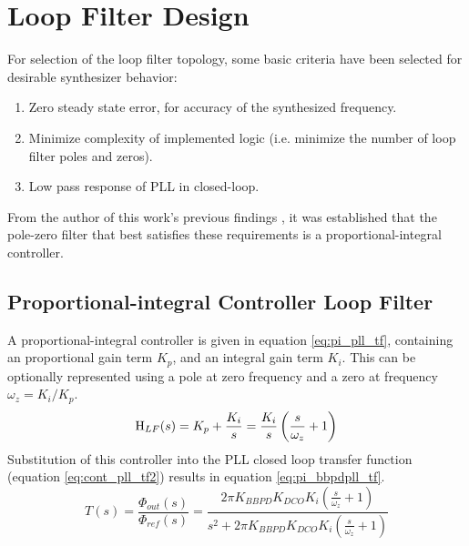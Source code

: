 \section{Loop Filter Design}\label{sec:design_lf}
	For selection of the loop filter topology, some basic criteria have been selected for desirable synthesizer behavior:
	\begin{enumerate}[itemsep=0pt,label=\protect\mycirc{\arabic*}]
		\setlength\itemsep{-0.8em}
		\item Zero steady state error, for accuracy of the synthesized frequency.
		\item Minimize complexity of implemented logic (i.e. minimize the number of loop filter poles and zeros).
		\item Low pass response of PLL in closed-loop.
	\end{enumerate}
	From the author of this work's previous findings \cite{Me}, it was established that the pole-zero filter that best satisfies these requirements is a proportional-integral controller.

\subsection{Proportional-integral Controller Loop Filter}
 A proportional-integral controller \cite{ogata_2010_pid} is given in equation \ref{eq:pi_pll_tf}, containing an proportional gain term $K_p$, and an integral gain term $K_i$. This can be optionally represented using a pole at zero frequency and a zero at frequency $\omega_z = K_i/K_p$.
			\begin{equation} \label{eq:pi_pll_tf}
				\textnormal{H}_{LF}(s) = K_p + \frac{K_i}{s}  = \frac{K_i}{s}\left(\frac{s}{\omega_z} + 1\right) 
			\end{equation}
			Substitution of this controller into the PLL closed loop transfer function (equation \ref{eq:cont_pll_tf2}) results in equation \ref{eq:pi_bbpdpll_tf}.
			\begin{equation}\label{eq:pi_bbpdpll_tf}
				T(s) = \frac{\Phi_{out}(s)}{\Phi_{ref}(s)} =  \frac{ 2\pi K_{BBPD}K_{DCO}K_{i} \left(\frac{s}{\omega_z} + 1\right) }{s^2 + 2\pi K_{BBPD}K_{DCO}K_{i}\left(\frac{s}{\omega_z} + 1\right) }
			\end{equation}

